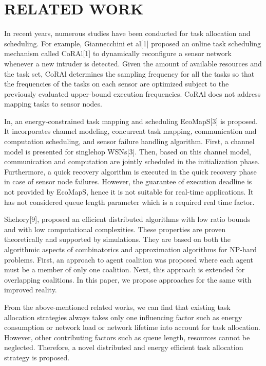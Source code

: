 \documentclass[conference]{IEEEtran}
\begin{document}
\section{RELATED WORK}
\par In recent years, numerous studies have been conducted for task allocation and scheduling. For example, Giannecchini et al[1] proposed an online task scheduling mechanism called CoRAl[1] to dynamically reconfigure a sensor network whenever a new intruder is detected. Given the amount of available resources and the task set, CoRAl determines the sampling frequency for all the tasks so that the frequencies of the tasks on each sensor are optimized subject to the previously evaluated upper-bound execution frequencies. CoRAl does not address mapping tasks to sensor nodes.
\par In, an energy-constrained task mapping and scheduling EcoMapS[3] is proposed. It incorporates channel modeling, concurrent task mapping, communication and computation scheduling, and sensor failure handling algorithm. First, a channel model is presented for singlehop WSNs[3]. Then, based on this channel model, communication and computation are jointly scheduled in the initialization phase. Furthermore, a quick recovery algorithm is executed in the quick recovery phase in case of sensor node failures. However, the guarantee of execution deadline is not provided by EcoMapS, hence it is not suitable for real-time applications. It has not considered queue length parameter which is a required real time factor.
\par Shehory[9], proposed an efficient distributed algorithms with low ratio bounds and with low computational complexities. These properties are proven theoretically and supported by simulations. They are based on both the algorithmic aspects of combinatorics and approximation algorithms for NP-hard problems. First, an approach to agent coalition was proposed where each agent must be a member of only one coalition. Next, this approach is extended for overlapping coalitions. In this paper, we propose approaches for the same with improved reality.  
\par From the above-mentioned related works, we can find that existing task allocation strategies always takes only one influencing factor such as energy consumption or network load or network lifetime into account for task allocation. However, other contributing factors such as queue length, resources cannot be neglected. Therefore, a novel distributed and energy efficient task allocation strategy is proposed.
\end{document}
